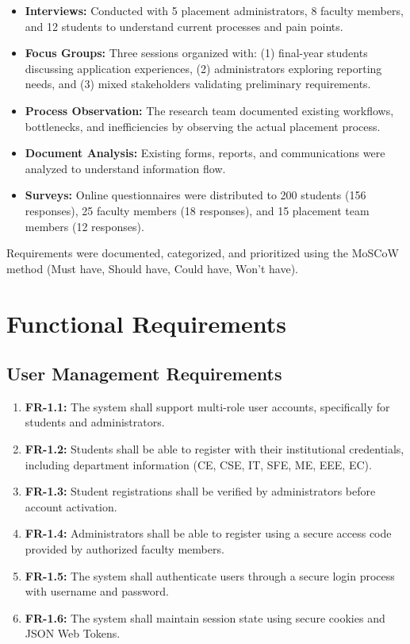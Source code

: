 \documentclass[12pt,a4paper]{report}
\begin{document}
\begin{itemize}
    \item \textbf{Interviews:} Conducted with 5 placement administrators, 8 faculty members, and 12 students to understand current processes and pain points.
    
    \item \textbf{Focus Groups:} Three sessions organized with: (1) final-year students discussing application experiences, (2) administrators exploring reporting needs, and (3) mixed stakeholders validating preliminary requirements.
    
    \item \textbf{Process Observation:} The research team documented existing workflows, bottlenecks, and inefficiencies by observing the actual placement process.
    
    \item \textbf{Document Analysis:} Existing forms, reports, and communications were analyzed to understand information flow.
    
    \item \textbf{Surveys:} Online questionnaires were distributed to 200 students (156 responses), 25 faculty members (18 responses), and 15 placement team members (12 responses).
\end{itemize}

Requirements were documented, categorized, and prioritized using the MoSCoW method (Must have, Should have, Could have, Won't have).

\section{Functional Requirements}

\subsection{User Management Requirements}
\begin{enumerate}
    \item \textbf{FR-1.1:} The system shall support multi-role user accounts, specifically for students and administrators.
    
    \item \textbf{FR-1.2:} Students shall be able to register with their institutional credentials, including department information (CE, CSE, IT, SFE, ME, EEE, EC).
    
    \item \textbf{FR-1.3:} Student registrations shall be verified by administrators before account activation.
    
    \item \textbf{FR-1.4:} Administrators shall be able to register using a secure access code provided by authorized faculty members.
    
    \item \textbf{FR-1.5:} The system shall authenticate users through a secure login process with username and password.
    
    \item \textbf{FR-1.6:} The system shall maintain session state using secure cookies and JSON Web Tokens.
\end{enumerate}
\end{document}

